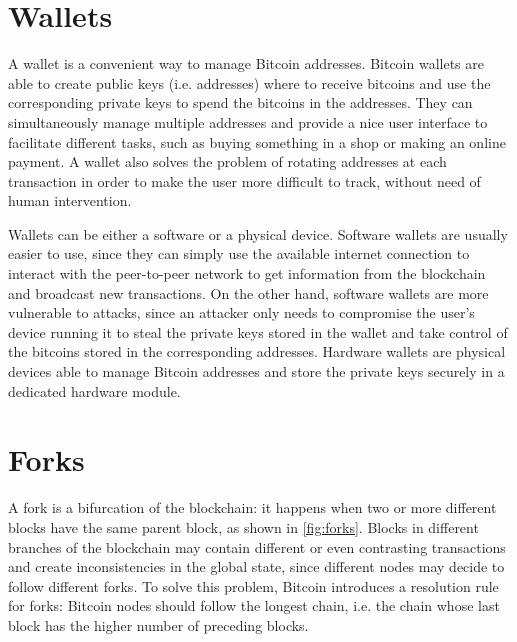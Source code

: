 \section{Wallets}
A wallet is a convenient way to manage Bitcoin addresses.
Bitcoin wallets are able to create public keys (i.e. addresses) where to receive bitcoins and use the corresponding private keys to spend the bitcoins in the addresses.
They can simultaneously manage multiple addresses and provide a nice user interface to facilitate different tasks, such as buying something in a shop or making an online payment.
A wallet also solves the problem of rotating addresses at each transaction in order to make the user more difficult to track, without need of human intervention.

Wallets can be either a software or a physical device.
Software wallets are usually easier to use, since they can simply use the available internet connection to interact with the peer-to-peer network to get information from the blockchain and broadcast new transactions.
On the other hand, software wallets are more vulnerable to attacks, since an attacker only needs to compromise the user's device running it to steal the private keys stored in the wallet and take control of the bitcoins stored in the corresponding addresses.
Hardware wallets are physical devices able to manage Bitcoin addresses and store the private keys securely in a dedicated hardware module.

\section{Forks}
A fork is a bifurcation of the blockchain:
it happens when two or more different blocks have the same parent block, as shown in \cref{fig:forks}.
Blocks in different branches of the blockchain may contain different or even contrasting transactions and create inconsistencies in the global state, since different nodes may decide to follow different forks.
To solve this problem, Bitcoin introduces a resolution rule for forks:
Bitcoin nodes should follow the longest chain, i.e. the chain whose last block has the higher number of preceding blocks.

